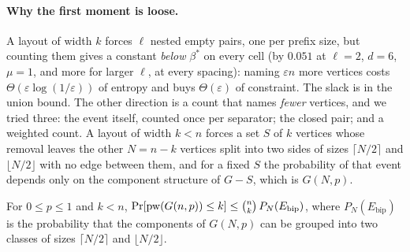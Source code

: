 \paragraph{Why the first moment is loose.}
A layout of width $k$ forces $\ell$ nested empty pairs, one per prefix size,
but counting them gives a constant \emph{below} $\beta^{*}$ on every cell (by
$0.051$ at $\ell=2$, $d=6$, $\mu=1$, and more for larger $\ell$, at every
spacing): naming $\varepsilon n$ more vertices costs
$\Theta(\varepsilon\log(1/\varepsilon))$ of entropy and buys
$\Theta(\varepsilon)$ of constraint. The slack is in the union bound. The
other direction is a count that names \emph{fewer} vertices, and we tried
three: the event itself, counted once per separator; the closed pair; and a
weighted count. A layout of width $k<n$ forces a set $S$ of $k$ vertices whose
removal leaves the other $N=n-k$ vertices split into two sides of sizes
$\lceil N/2\rceil$ and $\lfloor N/2\rfloor$ with no edge between them, and
for a fixed $S$ the probability of that event depends only on the component
structure of $G-S$, which is $G(N,p)$.

\begin{theorem}
\label{thm:separator}
For $0\le p\le1$ and $k<n$,
$\Pr[\mathrm{pw}(G(n,p))\le k]\le\binom nk\,P_N(E_{\mathrm{bip}})$, where
$P_N(E_{\mathrm{bip}})$ is the probability that the components of $G(N,p)$ can
be grouped into two classes of sizes $\lceil N/2\rceil$ and $\lfloor N/2\rfloor$.
\end{theorem}

